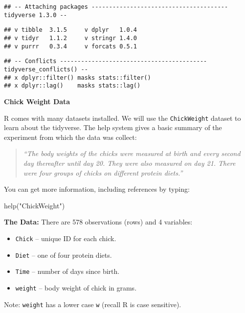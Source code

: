 \documentclass[
]{book}
\newenvironment{Shaded}{\begin{snugshade}}{\end{snugshade}}
\newcommand{\FunctionTok}[1]{\textcolor[rgb]{0.00,0.00,0.00}{#1}}
\newcommand{\NormalTok}[1]{#1}
\newcommand{\StringTok}[1]{\textcolor[rgb]{0.31,0.60,0.02}{#1}}
\providecommand{\tightlist}{%
  \setlength{\itemsep}{0pt}\setlength{\parskip}{0pt}}
\begin{document}
\begin{verbatim}
## -- Attaching packages --------------------------------------- tidyverse 1.3.0 --
\end{verbatim}

\begin{verbatim}
## v tibble  3.1.5     v dplyr   1.0.4
## v tidyr   1.1.2     v stringr 1.4.0
## v purrr   0.3.4     v forcats 0.5.1
\end{verbatim}

\begin{verbatim}
## -- Conflicts ------------------------------------------ tidyverse_conflicts() --
## x dplyr::filter() masks stats::filter()
## x dplyr::lag()    masks stats::lag()
\end{verbatim}

\textbf{Chick Weight Data}

R comes with many datasets installed. We will use the \texttt{ChickWeight} dataset
to learn about the tidyverse. The help system gives a basic summary of the experiment from
which the data was collect:

\begin{quote}
\emph{``The body weights of the chicks were measured at birth and every second day thereafter
until day 20. They were also measured on day 21. There were four groups of chicks on
different protein diets.''}
\end{quote}

You can get more information, including references by typing:

\begin{Shaded}
\begin{Highlighting}[]
\FunctionTok{help}\NormalTok{(}\StringTok{"ChickWeight"}\NormalTok{)}
\end{Highlighting}
\end{Shaded}

\textbf{The Data: }
There are 578 observations (rows) and 4 variables:

\begin{itemize}
\tightlist
\item
  \texttt{Chick} -- unique ID for each chick.
\item
  \texttt{Diet} -- one of four protein diets.
\item
  \texttt{Time} -- number of days since birth.
\item
  \texttt{weight} -- body weight of chick in grams.
\end{itemize}

Note: \texttt{weight} has a lower case \texttt{w} (recall R is case sensitive).
\end{document}
